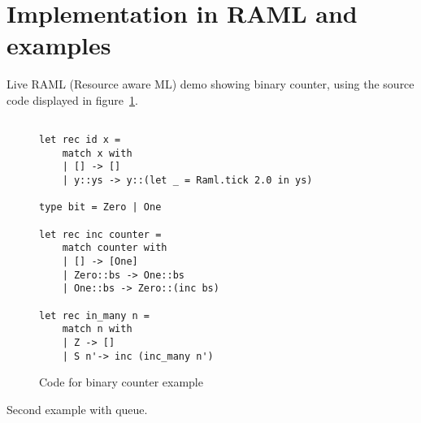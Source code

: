 \documentclass{article}
\begin{document}
\section{Implementation in RAML and examples}
Live RAML (Resource aware ML) demo showing binary counter, using the source code displayed in figure~\ref{code:binary-counter}.
\begin{figure}[ht]
\begin{lstlisting}[language=caml,frame=single,basicstyle=\footnotesize]

let rec id x =
    match x with
    | [] -> []
    | y::ys -> y::(let _ = Raml.tick 2.0 in ys)

type bit = Zero | One

let rec inc counter = 
    match counter with
    | [] -> [One]
    | Zero::bs -> One::bs 
    | One::bs -> Zero::(inc bs)

let rec in_many n = 
    match n with
    | Z -> []
    | S n'-> inc (inc_many n')
\end{lstlisting}
\caption{Code for binary counter example}
\label{code:binary-counter}
\end{figure}
Second example with queue.
\end{document}

